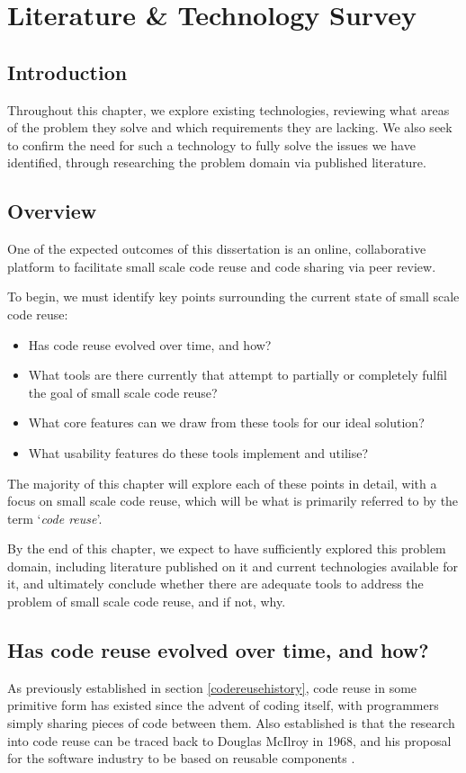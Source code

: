 \chapter{Literature \& Technology Survey} \label{littechsurvey}
\section{Introduction}
Throughout this chapter, we explore existing technologies, reviewing what areas of the problem they solve and which requirements they are lacking.
We also seek to confirm the need for such a technology to fully solve the issues we have identified, through researching the problem domain via published literature.

\section{Overview}
One of the expected outcomes of this dissertation is an online, collaborative platform to facilitate small scale code reuse and code sharing via peer review.

To begin, we must identify key points surrounding the current state of small scale code reuse:


\begin{itemize}
\item Has code reuse evolved over time, and how?
\item What tools are there currently that attempt to partially or completely fulfil the goal of small scale code reuse?
\item What core features can we draw from these tools for our ideal solution?
\item What usability features do these tools implement and utilise?
\end{itemize}


The majority of this chapter will explore each of these points in detail, with a focus on small scale code reuse, which will be what is primarily referred to by the term `\textit{code reuse}'. 

By the end of this chapter, we expect to have sufficiently explored this problem domain, including literature published on it and current technologies available for it, and ultimately conclude whether there are adequate tools to address the problem of small scale code reuse, and if not, why.

\section{Has code reuse evolved over time, and how?}
As previously established in section \ref{codereusehistory}, code reuse in some primitive form has existed since the advent of coding itself, with programmers simply sharing pieces of code between them. 
Also established is that the research into code reuse can be traced back to Douglas McIlroy in 1968, and his proposal for the software industry to be based on reusable components \cite{Naur1969,Jacobson1997}. 

